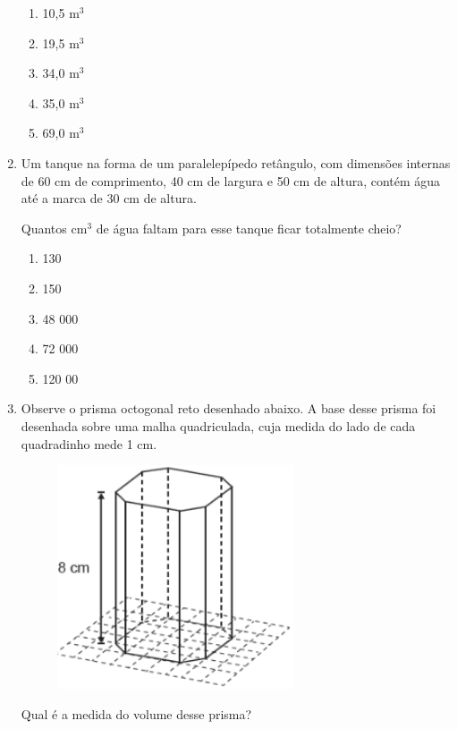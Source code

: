 \documentclass[twocolumn,oneside,a4paper,12.0pt]{article}
\begin{document}
\begin{enumerate}
\begin{enumerate}
\item 10,5 m$^3$
\item 19,5 m$^3$
\item 34,0 m$^3$
\item 35,0 m$^3$
\item 69,0 m$^3$
\end{enumerate}


\item Um tanque na forma de um paralelepípedo retângulo, com dimensões internas de 60 cm de comprimento, 40 cm de largura e 50 cm de altura, contém água até a marca de 30 cm de altura.

Quantos cm$^3$ de água faltam para esse tanque ficar totalmente cheio?

\begin{enumerate}
\item 130
\item 150
\item 48 000
\item 72 000
\item 120 00
\end{enumerate}


\item Observe o prisma octogonal reto desenhado abaixo. A base desse prisma foi desenhada sobre uma malha quadriculada, cuja medida do lado de cada quadradinho mede 1 cm.

	\begin{figure}[!htb]
	\center
	\includegraphics[width=7cm]{Extras/v3.png}
	\end{figure}

Qual é a medida do volume desse prisma?


\end{enumerate}
\end{document}
